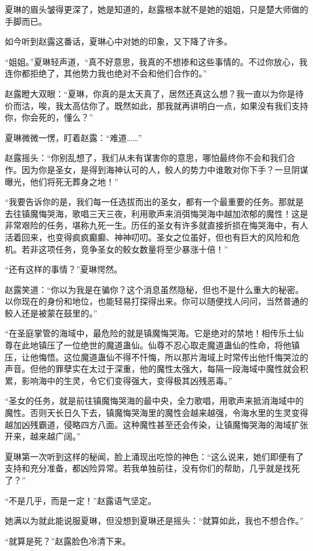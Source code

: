 \begin{this_body}
夏琳的眉头皱得更深了，她是知道的，赵露根本就不是她的姐姐，只是楚大师做的手脚而已。

如今听到赵露这番话，夏琳心中对她的印象，又下降了许多。

“姐姐。”夏琳轻声道，“真不好意思，我真的不想掺和这些事情的。不过你放心，我连你都拒绝了，其他势力我也绝对不会和他们合作的。”

赵露瞪大双眼：“夏琳，你真的是太天真了，居然还真这么想？我一直以为你是待价而沽，唉，我太高估你了。既然如此，那我就再讲明白一点，如果没有我们支持你，你会死的，懂么？”

夏琳微微一愣，盯着赵露：“难道……”

赵露摇头：“你别乱想了，我们从未有谋害你的意思，哪怕最终你不会和我们合作。因为你是圣女，是得到海神认可的人，鲛人的势力中谁敢对你下手？一旦阴谋曝光，他们将死无葬身之地！”

“我要告诉你的是，我们每一任选拔而出的圣女，都有一个最重要的任务。那就是去往镇魔悔哭海，歌唱三天三夜，利用歌声来消弭悔哭海中越加浓郁的魔性！这是非常艰险的任务，堪称九死一生。历任的圣女有许多就直接折损在悔哭海中，有人活着回来，也变得疯疯癫癫、神神叨叨。圣女之位虽好，但也有巨大的风险和危机。若非这项任务，竞争圣女的鲛女数量将至少暴涨十倍！”

“还有这样的事情？”夏琳愕然。

赵露笑道：“你以为我是在骗你？这个消息虽然隐秘，但也不是什么重大的秘密。以你现在的身份和地位，也能轻易打探得出来。你可以随便找人问问，当然普通的鲛人还是被蒙在鼓里的。”

“在圣庭掌管的海域中，最危险的就是镇魔悔哭海。它是绝对的禁地！相传乐土仙尊在此地镇压了一位绝世的魔道蛊仙。仙尊不忍心取走魔道蛊仙的性命，将他镇压，让他悔悟。这位魔道蛊仙不得不忏悔，所以那片海域上时常传出他忏悔哭泣的声音。但他的罪孽实在太过于深重，他的魔性太强大，每隔一段海域中魔性就会积累，影响海中的生灵，令它们变得强大，变得极其凶残恶毒。”

“圣女的任务，就是前往镇魔悔哭海的最中央，全力歌唱，用歌声来抵消海域中的魔性。否则天长日久下去，镇魔悔哭海里的魔性会越来越强，令海水里的生灵变得越加凶残霸道，侵略四方八面。这种魔性甚至还会传染，让镇魔悔哭海的海域扩张开来，越来越广阔。”

夏琳第一次听到这样的秘闻，脸上涌现出吃惊的神色：“这么说来，她们即便有了支持和充分准备，都凶险异常。若我单独前往，没有你们的帮助，几乎就是找死了？”

“不是几乎，而是一定！”赵露语气坚定。

她满以为就此能说服夏琳，但没想到夏琳还是摇头：“就算如此，我也不想合作。”

“就算是死？”赵露脸色冷清下来。


\end{this_body}
